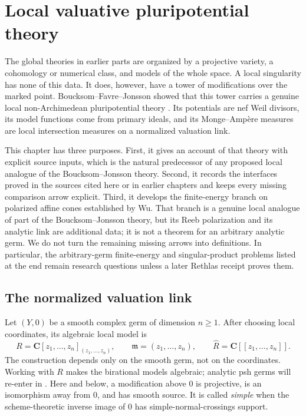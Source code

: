 \chapter{Local valuative pluripotential theory}
\label{chap:local-valuative-psh}

The global theories in earlier parts are organized by a projective variety,
a cohomology or numerical class, and models of the whole space.  A local
singularity has none of this data.  It does, however, have a tower of
modifications over the marked point.  Boucksom--Favre--Jonsson showed that
this tower carries a genuine local non-Archimedean pluripotential theory
\cite{BFJ08}.  Its potentials are nef Weil divisors, its model functions come
from primary ideals, and its Monge--Amp\`ere measures are local intersection
measures on a normalized valuation link.

This chapter has three purposes.  First, it gives an account of that theory
with explicit source inputs, which is the natural predecessor of any proposed local
analogue of the Boucksom--Jonsson theory.  Second, it records the interfaces
proved in the sources cited here or in earlier chapters and keeps every
missing comparison arrow explicit.  Third, it develops the finite-energy
branch on polarized affine cones established by Wu.  That branch is a genuine
local analogue of part of the Boucksom--Jonsson theory, but its Reeb
polarization and its analytic link are additional data; it is not a theorem
for an arbitrary analytic germ.  We do not turn the remaining missing arrows
into definitions.  In particular, the arbitrary-germ finite-energy and
singular-product problems listed at the end remain research questions unless
a later Rethlas receipt proves them.

\section{The normalized valuation link}
\label{sec:local-normalized-link}

Let $(Y,0)$ be a smooth complex germ of dimension $n\geq1$.  After
choosing local coordinates, its algebraic local model is
\[
 R=\mathbf C[z_1,\ldots,z_n]_{(z_1,\ldots,z_n)},
 \qquad
 \mathfrak m=(z_1,\ldots,z_n),
 \qquad
 \widehat R=\mathbf C[[z_1,\ldots,z_n]].
\tag{70.1}\label{eq:local-regular-ring}
\]
The construction depends only on the smooth germ, not on the coordinates.
Working with $R$ makes the birational models algebraic; analytic psh germs
will re-enter in .
Here and below, a modification above $0$ is projective, is an isomorphism
away from $0$, and has smooth source.  It is called \emph{simple} when
the scheme-theoretic inverse image of $0$ has simple-normal-crossings
support.

